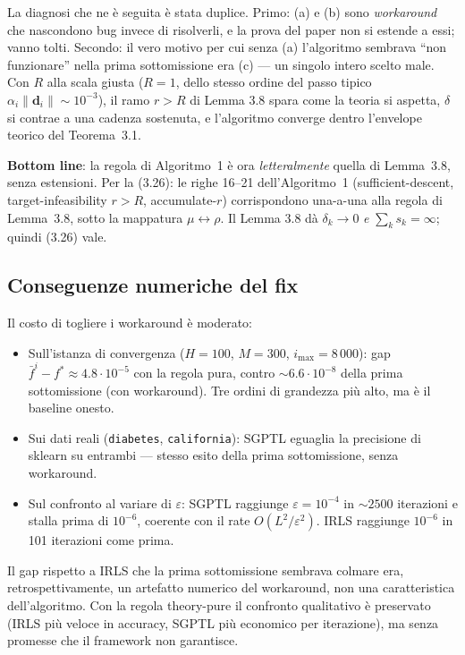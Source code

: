 \documentclass[11pt,a4paper]{article}
\newcommand{\norm}[1]{\left\|#1\right\|}
\newcommand{\bd}{\mathbf{d}}
\theoremstyle{definition}
\begin{document}
\begin{tcolorbox}[intuition,title={Il fix: era $R$, non l'iter-fallback}]
La diagnosi che ne è seguita è stata duplice. Primo: (a) e (b) sono \emph{workaround} che nascondono bug invece di risolverli, e la prova del paper non si estende a essi; vanno tolti. Secondo: il vero motivo per cui senza (a) l'algoritmo sembrava ``non funzionare'' nella prima sottomissione era (c) --- un singolo intero scelto male. Con $R$ alla scala giusta ($R = 1$, dello stesso ordine del passo tipico $\alpha_i\norm{\bd_i} \sim 10^{-3}$), il ramo $r > R$ di Lemma 3.8 spara come la teoria si aspetta, $\delta$ si contrae a una cadenza sostenuta, e l'algoritmo converge dentro l'envelope teorico del Teorema~3.1.

\textbf{Bottom line}: la regola di Algoritmo~1 è ora \emph{letteralmente} quella di Lemma~3.8, senza estensioni. Per la (3.26): le righe 16--21 dell'Algoritmo~1 (sufficient-descent, target-infeasibility $r > R$, accumulate-$r$) corrispondono una-a-una alla regola di Lemma~3.8, sotto la mappatura $\mu \leftrightarrow \rho$. Il Lemma 3.8 dà $\delta_k \to 0$ \emph{e} $\sum_k s_k = \infty$; quindi (3.26) vale.
\end{tcolorbox}

\subsection*{Conseguenze numeriche del fix}

Il costo di togliere i workaround è moderato:
\begin{itemize}[leftmargin=*]
\item Sull'istanza di convergenza ($H=100$, $M=300$, $i_{\max}=8\,000$): gap $\bar f^{i} - f^* \approx 4.8 \cdot 10^{-5}$ con la regola pura, contro $\sim 6.6 \cdot 10^{-8}$ della prima sottomissione (con workaround). Tre ordini di grandezza più alto, ma è il baseline onesto.
\item Sui dati reali (\texttt{diabetes}, \texttt{california}): SGPTL eguaglia la precisione di sklearn su entrambi --- stesso esito della prima sottomissione, senza workaround.
\item Sul confronto al variare di $\varepsilon$: SGPTL raggiunge $\varepsilon = 10^{-4}$ in $\sim 2500$ iterazioni e stalla prima di $10^{-6}$, coerente con il rate $O(L^2/\varepsilon^2)$. IRLS raggiunge $10^{-6}$ in 101 iterazioni come prima.
\end{itemize}

Il gap rispetto a IRLS che la prima sottomissione sembrava colmare era, retrospettivamente, un artefatto numerico del workaround, non una caratteristica dell'algoritmo. Con la regola theory-pure il confronto qualitativo è preservato (IRLS più veloce in accuracy, SGPTL più economico per iterazione), ma senza promesse che il framework non garantisce.
\end{document}
